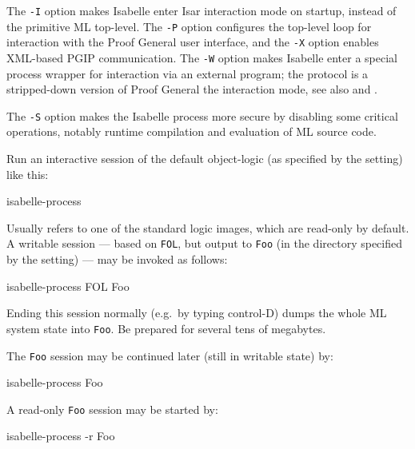 \begin{isabellebody}
\begin{isamarkuptext}
  \medskip The \verb|-I| option makes Isabelle enter Isar
  interaction mode on startup, instead of the primitive ML top-level.
  The \verb|-P| option configures the top-level loop for
  interaction with the Proof General user interface, and the
  \verb|-X| option enables XML-based PGIP communication.  The
  \verb|-W| option makes Isabelle enter a special process
  wrapper for interaction via an external program; the protocol is a
  stripped-down version of Proof General the interaction mode, see
  also \hyperlink{file.~~/src/Pure/Tools/isabelle-process.ML}{\mbox{}} and \hyperlink{file.~~/src/Pure/Tools/isabelle-process.scala}{\mbox{}}.

  \medskip The \verb|-S| option makes the Isabelle process more
  secure by disabling some critical operations, notably runtime
  compilation and evaluation of ML source code.%
\end{isamarkuptext}%
\isamarkuptrue%
%
\isamarkuptrue%
%
\begin{isamarkuptext}%
Run an interactive session of the default object-logic (as specified
  by the \hyperlink{setting.ISABELLE-LOGIC}{\mbox{}} setting) like this:
\begin{ttbox}
isabelle-process
\end{ttbox}

  Usually \hyperlink{setting.ISABELLE-LOGIC}{\mbox{}} refers to one of the standard
  logic images, which are read-only by default.  A writable session
  --- based on \verb|FOL|, but output to \verb|Foo| (in the
  directory specified by the \hyperlink{setting.ISABELLE-OUTPUT}{\mbox{}} setting) ---
  may be invoked as follows:
\begin{ttbox}
isabelle-process FOL Foo
\end{ttbox}
  Ending this session normally (e.g.\ by typing control-D) dumps the
  whole ML system state into \verb|Foo|. Be prepared for several
  tens of megabytes.

  The \verb|Foo| session may be continued later (still in
  writable state) by:
\begin{ttbox}
isabelle-process Foo
\end{ttbox}
  A read-only \verb|Foo| session may be started by:
\begin{ttbox}
isabelle-process -r Foo
\end{ttbox}


\end{isamarkuptext}
\end{isabellebody}
